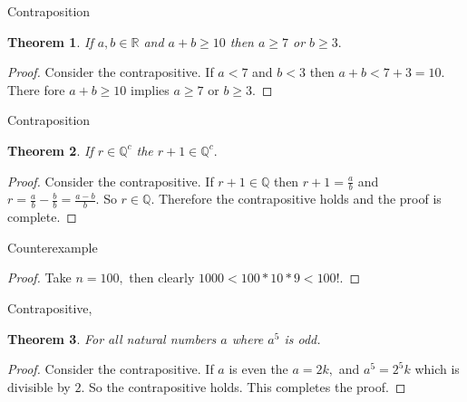 \documentclass[letter]{article}
\newtheorem{theorem}{Theorem}
\newenvironment{menumerate}{%
  \edef\backupindent{\the\parindent}%
  \enumerate%
  \setlength{\parindent}{\backupindent}%
}{\endenumerate}
\begin{document}
\begin{menumerate}
\begin{menumerate}
        \item Contraposition
        \begin{theorem}
            If $a,b \in \mathbb{R}$ and $a + b \geq 10$ then $a \geq 7$ or $b\geq 3.$
        \end{theorem}
        \begin{proof}
            Consider the contrapositive. If $a < 7$ and $b < 3$ then $a + b < 7 +3 = 10.$
            There fore $a +b \geq 10$ implies $a \geq 7$ or $b \geq 3.$
        \end{proof}

        \item Contraposition
        \begin{theorem}
        If $r \in \mathbb{Q}^c$ the $r+1 \in \mathbb{Q}^c.$
        \end{theorem}
        \begin{proof}
        Consider the contrapositive. If $r + 1 \in \mathbb{Q}$ then
        $r + 1 = \frac{a}{b}$ and $r = \frac{a}{b} -\frac{b}{b} = \frac{a-b}{b}$.
        So $r \in \mathbb{Q}.$ Therefore the contrapositive holds and the proof is complete.
        \end{proof}

        \item Counterexample
        \begin{proof}
            Take $n = 100,$ then clearly $1000 < 100*10*9 < 100!.$
        \end{proof}

        \item Contrapositive,
        \begin{theorem}
            For all natural numbers $a$ where $a^5$ is odd.
        \end{theorem}
        \begin{proof}
            Consider the contrapositive. If $a$ is even the $a = 2k,$ and $a^5 = 2^5k$ which is
            divisible by $2.$ So the contrapositive holds. This completes the proof.
        \end{proof}
    \end{menumerate}

\end{menumerate}
\end{document}
